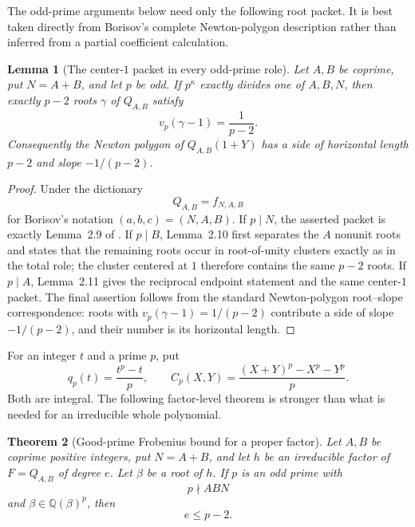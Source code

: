 \documentclass[11pt]{article}
\newtheorem{theorem}{Theorem}[section]
\newtheorem{lemma}[theorem]{Lemma}
\theoremstyle{definition}
\newcommand{\Q}{\mathbb Q}
\begin{document}
The odd-prime arguments below need only the following root packet.  It is
best taken directly from Borisov's complete Newton-polygon description rather
than inferred from a partial coefficient calculation.

\begin{lemma}[The center-\(1\) packet in every odd-prime role]
\label{lem:centeroneedge}
Let \(A,B\) be coprime, put \(N=A+B\), and let \(p\) be odd.  If
\(p^\kappa\) exactly divides one of \(A,B,N\), then exactly \(p-2\) roots
\(\gamma\) of \(Q_{A,B}\) satisfy
\[
 v_p(\gamma-1)=\frac1{p-2}.
\]
Consequently the Newton polygon of \(Q_{A,B}(1+Y)\) has a side of
horizontal length \(p-2\) and slope \(-1/(p-2)\).
\end{lemma}

\begin{proof}
Under the dictionary
\[
 Q_{A,B}=f_{N,A,B}
\]
for Borisov's notation \((a,b,c)=(N,A,B)\).  If \(p\mid N\), the asserted
packet is exactly Lemma~2.9 of \cite{Borisov1998}.  If \(p\mid B\),
Lemma~2.10 first separates the \(A\) nonunit roots and states that the
remaining roots occur in root-of-unity clusters exactly as in the total role;
the cluster centered at \(1\) therefore contains the same \(p-2\) roots.
If \(p\mid A\), Lemma~2.11 gives the reciprocal endpoint statement and the
same center-\(1\) packet.  The final assertion follows from the standard
Newton-polygon root--slope correspondence: roots with
\(v_p(\gamma-1)=1/(p-2)\) contribute a side of slope \(-1/(p-2)\), and
their number is its horizontal length.
\end{proof}

For an integer \(t\) and a prime \(p\), put
\[
 q_p(t)=\frac{t^p-t}{p},
 \qquad
 C_p(X,Y)=\frac{(X+Y)^p-X^p-Y^p}{p}.
\]
Both are integral.  The following factor-level theorem is stronger than what
is needed for an irreducible whole polynomial.

\begin{theorem}[Good-prime Frobenius bound for a proper factor]
\label{thm:frobeniusfactor}
Let \(A,B\) be coprime positive integers, put \(N=A+B\), and let \(h\) be
an irreducible factor of \(F=Q_{A,B}\) of degree \(e\).  Let \(\beta\) be
a root of \(h\).  If \(p\) is an odd prime with
\[
 p\nmid ABN
\]
and \(\beta\in\Q(\beta)^p\), then
\begin{equation}
 e\leq p-2.
 \tag{14.3}
\end{equation}
\end{theorem}
\end{document}
